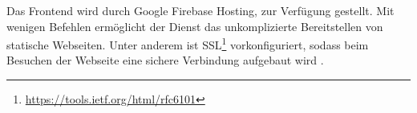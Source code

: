 Das Frontend wird durch Google Firebase Hosting, zur Verfügung gestellt.
Mit wenigen Befehlen ermöglicht der Dienst das unkomplizierte Bereitstellen von statische Webseiten.
Unter anderem ist SSL\footnote{\url{https://tools.ietf.org/html/rfc6101}}
vorkonfiguriert, sodass beim Besuchen der Webseite eine sichere
Verbindung aufgebaut wird \cite{FirebaseHosting}.


